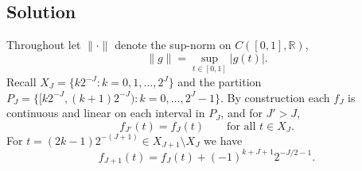\documentclass{article}
\begin{document}
\subsection*{Solution}

Throughout let $\|\cdot\|$ denote the sup-norm on $C([0,1],\mathbb{R})$,
\[
\|g\|=\sup_{t\in[0,1]}|g(t)|.
\]
Recall $X_J=\{k2^{-J}:k=0,1,\dots,2^J\}$ and the partition
$P_J=\{[k2^{-J},(k+1)2^{-J}):k=0,\dots,2^J-1\}$.  By construction each $f_J$ is continuous and linear on each
interval in $P_J$, and for $J'>J$,
\[
f_{J'}(t)=f_J(t)\qquad\text{for all }t\in X_J.
\]
For $t=(2k-1)2^{-(J+1)}\in X_{J+1}\setminus X_J$ we have
\[
f_{J+1}(t)=f_J(t)+(-1)^{k+J+1}2^{-J/2-1}.
\]
\end{document}
